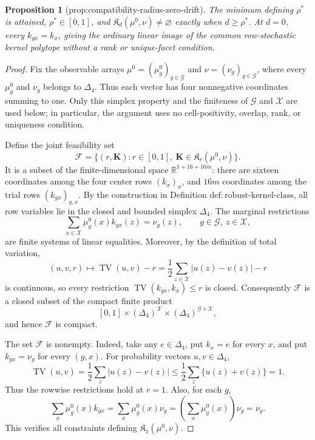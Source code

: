 \documentclass{article}
\newtheorem{proposition}{Proposition}
\begin{document}
\begin{proposition}[prop:compatibility-radius-zero-drift]\label{prop:compatibility-radius-zero-drift}
The minimum defining \(\rho^*\) is attained, \(\rho^*\in[0,1]\), and \(\mathfrak K_d(\mu^0,\nu)\neq\varnothing\) exactly when \(d\ge\rho^*\). At \(d=0\), every \(k_{gx}=k_x\), giving the ordinary linear image of the common row-stochastic kernel polytope without a rank or unique-facet condition.
\end{proposition}
\begin{proof}
Fix the observable arrays \(\mu^0=(\mu_g^0)_{g\in\mathcal G}\) and \(\nu=(\nu_g)_{g\in\mathcal G}\), where every \(\mu_g^0\) and \(\nu_g\) belongs to \(\Delta_4\).  Thus each vector has four nonnegative coordinates summing to one.  Only this simplex property and the finiteness of \(\mathcal G\) and \(\mathcal X\) are used below; in particular, the argument uses no cell-positivity, overlap, rank, or uniqueness condition.

Define the joint feasibility set
\[
 \mathcal F
 =\bigl\{(r,\mathbf K):r\in[0,1],\ \mathbf K\in\mathfrak K_r(\mu^0,\nu)\bigr\}.
\]
It is a subset of the finite-dimensional space \(\mathbb R^{1+16+16m}\): there are sixteen coordinates among the four center rows \((k_x)_x\), and \(16m\) coordinates among the trial rows \((k_{gx})_{g,x}\).  By the construction in Definition \(\mathrm{def:robust\mbox{-}kernel\mbox{-}class}\), all row variables lie in the closed and bounded simplex \(\Delta_4\).  The marginal restrictions
\[
 \sum_{x\in\mathcal X}\mu_g^0(x)k_{gx}(z)=\nu_g(z),
 \qquad g\in\mathcal G,\ z\in\mathcal X,
\]
are finite systems of linear equalities.  Moreover, by the definition of total variation,
\[
 (u,v,r)\longmapsto \operatorname{TV}(u,v)-r
 =\frac12\sum_{z\in\mathcal X}|u(z)-v(z)|-r
\]
is continuous, so every restriction \(\operatorname{TV}(k_{gx},k_x)\le r\) is closed.  Consequently \(\mathcal F\) is a closed subset of the compact finite product
\[
 [0,1]\times(\Delta_4)^{\mathcal X}
 \times(\Delta_4)^{\mathcal G\times\mathcal X},
\]
and hence \(\mathcal F\) is compact.

The set \(\mathcal F\) is nonempty.  Indeed, take any \(e\in\Delta_4\), put \(k_x=e\) for every \(x\), and put \(k_{gx}=\nu_g\) for every \((g,x)\).  For probability vectors \(u,v\in\Delta_4\),
\[
 \operatorname{TV}(u,v)
 =\frac12\sum_z|u(z)-v(z)|
 \le \frac12\sum_z\{u(z)+v(z)\}=1.
\]
Thus the rowwise restrictions hold at \(r=1\).  Also, for each \(g\),
\[
 \sum_x\mu_g^0(x)k_{gx}
 =\sum_x\mu_g^0(x)\nu_g
 =\left(\sum_x\mu_g^0(x)\right)\nu_g
 =\nu_g.
\]
This verifies all constraints defining \(\mathfrak K_1(\mu^0,\nu)\).


\end{proof}
\end{document}
